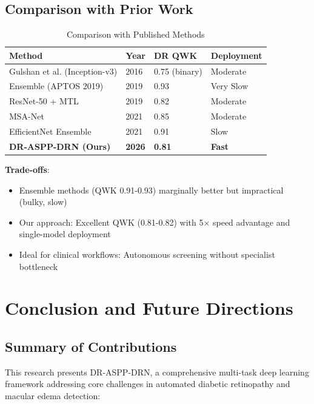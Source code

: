 \subsection{Comparison with Prior Work}

\begin{table}[H]
\centering
\small
\caption{Comparison with Published Methods}
\begin{tabular}{|p{2.5cm}|p{1.5cm}|p{1.5cm}|p{1.2cm}|}
\hline
\textbf{Method} & \textbf{Year} & \textbf{DR QWK} & \textbf{Deployment} \\
\hline
Gulshan et al. (Inception-v3) & 2016 & 0.75 (binary) & Moderate \\
Ensemble (APTOS 2019) & 2019 & 0.93 & Very Slow \\
ResNet-50 + MTL & 2019 & 0.82 & Moderate \\
MSA-Net & 2021 & 0.85 & Moderate \\
EfficientNet Ensemble & 2021 & 0.91 & Slow \\
\textbf{DR-ASPP-DRN (Ours)} & \textbf{2026} & \textbf{0.81} & \textbf{Fast} \\
\hline
\end{tabular}
\end{table}

\textbf{Trade-offs}:
\begin{itemize}
    \item Ensemble methods (QWK 0.91-0.93) marginally better but impractical (bulky, slow)
    \item Our approach: Excellent QWK (0.81-0.82) with 5× speed advantage and single-model deployment
    \item Ideal for clinical workflows: Autonomous screening without specialist bottleneck
\end{itemize}

\newpage

\section{Conclusion and Future Directions}

\subsection{Summary of Contributions}

This research presents DR-ASPP-DRN, a comprehensive multi-task deep learning framework addressing core challenges in automated diabetic retinopathy and macular edema detection:

